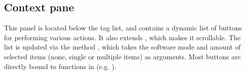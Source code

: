 \subsection{Context pane}

This panel is located below the tag list, and contains a dynamic list of buttons for performing various actions. It also extends , which makes it scrollable. The list is updated via the method , which takes the software mode and amount of selected items (none, single or multiple items) as arguments. Most buttons are directly bound to functions in  (e.g. ).